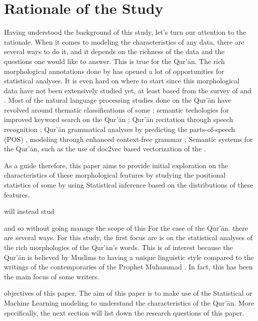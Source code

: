 \section{Rationale of the Study}\label{sec:rationale}
Having understood the background of this study, let's turn our attention to the rationale. When it comes to modeling the characteristics of any data, there are several ways to do it, and it depends on the richness of the data and the questions one would like to answer. This is true for the Qur'\=an. The rich morphological annotations done by  has opened a lot of opportunities for statistical analyses. It is even hard on where to start since this morphological data have not been extensively studied yet, at least based from the survey of  and . Most of the natural language processing studies done on the Qur'\=an have revolved around thematic classifications of some   ; semantic techologies for improved keyword search on the Qur'\=an ; Qur'\=an recitation through speech recognition ; Qur'\=an grammatical analyses by predicting the parts-of-speech (POS) ,   modeling through enhanced context-free grammar ; Semantic systems for the Qur'\=an, such as the use of doc2vec based vectorization of the   .



As a guide therefore, this paper aims to provide initial exploration on the characteristics of these morphological features by studying the positional statistics of some  by using Statistical inference based on the distributions of these features.



will instead stud


and so without going  manage the scope of this For the case of the Qur'\=an. there are several ways. For this study, the first focus are is on the statistical analyses of the rich morphologies of the Qur'\=an's words. This is of interest because the Qur'\=an is believed by Muslims to having a unique linguistic style compared to the writings of the contemporaries of the Prophet Muhammad . In fact, this has been the main focus of some writers.

objectives of this paper. The aim of this paper is to make use of the Statistical or Machine Learning modeling to understand the characteristics of the Qur'\=an. More specifically, the next section will list down the research questions of this paper.

